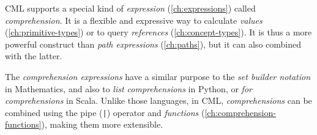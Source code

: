 CML supports a special kind of \emph{expression} (\ref{ch:expressions})
called \emph{comprehension}.
It is a flexible and expressive way
to calculate \emph{values} (\ref{ch:primitive-types})
or to query \emph{references} (\ref{ch:concept-types}).
It is thus a more powerful construct than \emph{path expressions} (\ref{ch:paths}),
but it can also combined with the latter.

The \emph{comprehension expressions} have a similar purpose
to the \emph{set builder notation} in Mathematics,
and also to \emph{list comprehensions} in Python,
or \emph{for comprehensions} in Scala.
Unlike those languages, in CML,
\emph{comprehensions} can be combined using the pipe (\verb!|!) operator
and \emph{functions} (\ref{ch:comprehension-functions}),
making them more extensible.
